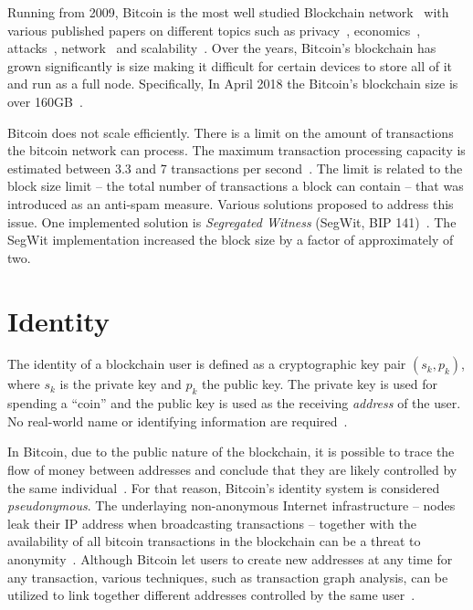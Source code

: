 Running from 2009, Bitcoin is the most well studied Blockchain network~\cite{10.1007/978-3-662-46803-6_10} with various published papers on different topics such as privacy~\cite{10.1007/978-3-319-70278-0_8, 10.1007/978-3-642-39884-1_2, Bonneau14e.w.:mixcoin, 10.1007/978-3-662-44774-1_9}, economics~\cite{Babaioff:2012:BRB:2229012.2229022, 10.1007/978-3-319-70278-0_17, Bentov2017DecentralizedPM, Carlsten:2016:IBW:2976749.2978408}, attacks~\cite{DBLP:journals_corr_Bahack13, DBLP:journals_corr_EyalS13}, network~\cite{10.1007/978-3-662-44774-1_7, 190890} and scalability~\cite{kiayias2017non, 10.1007/978-3-662-53357-4_5, 10.1007/978-3-662-53357-4_8}. Over the years, Bitcoin's blockchain has grown significantly is size making it difficult for certain devices to store all of it and run as a full node. Specifically, In April 2018 the Bitcoin's blockchain size is over 160GB~\cite{btc_bl_size}.

Bitcoin does not scale efficiently. There is a limit on the amount of transactions the bitcoin network can process. The maximum transaction processing capacity is estimated between 3.3 and 7 transactions per second~\cite{10.1007/978-3-662-53357-4_8}. The limit is related to the block size limit -- the total number of transactions a block can contain -- that was introduced as an anti-spam measure. Various solutions proposed to address this issue. One implemented solution is \textit{Segregated Witness} (SegWit, BIP 141)~\cite{segwit}. The SegWit implementation increased the block size by a factor of approximately of two.

\section{Identity}\label{blockchain:identity}

The identity of a blockchain user is defined as a cryptographic key pair $(s_k, p_k)$, where $s_k$ is the private key and $p_k$ the public key. The private key is used for spending a ``coin'' and the public key is used as the receiving \textit{address} of the user. No real-world name or identifying information are required~\cite{7163021,nakamoto2012bitcoin}.

In Bitcoin, due to the public nature of the blockchain, it is possible to trace the flow of money between addresses and conclude that they are likely controlled by the same individual~\cite{7163021,10.1007/978-3-319-17016-9_1}. For that reason, Bitcoin's identity system is considered \textit{pseudonymous}. The underlaying non-anonymous Internet infrastructure -- nodes leak their IP address when broadcasting transactions -- together with the availability of all bitcoin transactions in the blockchain can be a threat to anonymity~\cite{10.1007/978-3-319-17016-9_1, 7163021,Meiklejohn:2013:FBC:2504730.2504747,6113303,10.1007/978-3-642-39884-1_2,fi5020237}.
Although Bitcoin let users to create new addresses at any time for any transaction, various techniques, such as transaction graph analysis, can be utilized to link together different addresses controlled by the same user~\cite{7163021,Meiklejohn:2013:FBC:2504730.2504747,6113303,10.1007/978-3-642-39884-1_2,fi5020237}.

